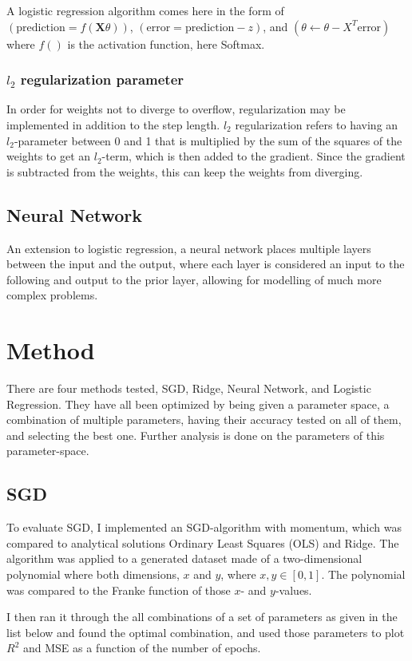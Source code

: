 \documentclass[a4paper, UKenglish]{article}
\newcommand{\0}{\mathbf{0}}
\newcommand{\1}{\mathbf{1}}
\begin{document}
A logistic regression algorithm comes here in the form of $(\text{prediction} = f(\textbf{X}\theta))$, $(\text{error} = \text{prediction} - z)$, and $(\theta \leftarrow \theta - X^T \text{error}) $ where $f()$ is the activation function, here Softmax.


\subsubsection{$l_2$ regularization parameter}
In order for weights not to diverge to overflow, regularization may be implemented in addition to the step length. $l_2$ regularization refers to having an $l_2$-parameter between 0 and 1 that is multiplied by the sum of the squares of the weights to get an $l_2$-term, which is then added to the gradient. Since the gradient is subtracted from the weights, this can keep the weights from diverging.


\subsection{Neural Network}
An extension to logistic regression, a neural network places multiple layers between the input and the output, where each layer is considered an input to the following and output to the prior layer, allowing for modelling of much more complex problems.

\section{Method}
There are four methods tested, SGD, Ridge, Neural Network, and Logistic Regression. They have all been optimized by being given a parameter space, a combination of multiple parameters, having their accuracy tested on all of them, and selecting the best one. Further analysis is done on the parameters of this parameter-space.

\subsection{SGD} 
To evaluate SGD, I implemented an SGD-algorithm with momentum, which was compared to analytical solutions Ordinary Least Squares (OLS) and Ridge. The algorithm was applied to a generated dataset made of a two-dimensional polynomial where both dimensions, $x$ and $y$, where $x, y \in [0,1]$. The polynomial was compared to the Franke function of those $x$- and $y$-values.

I then ran it through the all combinations of a set of parameters as given in the list below and found the optimal combination, and used those parameters to plot $R^2$ and MSE as a function of the number of epochs.
\end{document}
